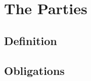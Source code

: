 \section{The Parties} \label{sec:parties}

\subsection{Definition} \label{sec:parties:definition}

\lipsum[2]

\subsection{Obligations} \label{sec:parties:obligations}

\lipsum[2]